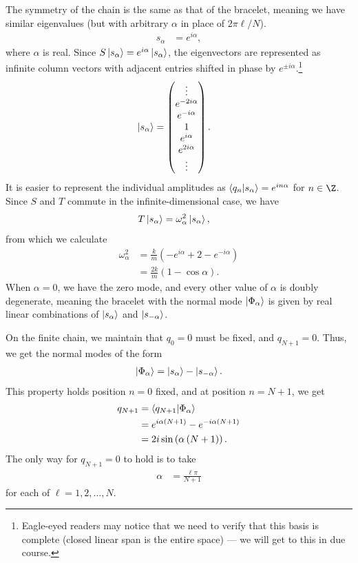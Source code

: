 \documentclass[10pt]{mypackage}
\begin{document}
\begin{example}
  The symmetry of the chain is the same as that of the bracelet, meaning we have similar eigenvalues (but with arbitrary $\alpha$ in place of $2\pi \ell/N$).
  \begin{align*}
    s_{\alpha} &= e^{i\alpha},
  \end{align*}
  where $\alpha$ is real. Since $S\ket{s_{\alpha}} = e^{i\alpha}\ket{s_{\alpha}}$, the eigenvectors are represented as infinite column vectors with adjacent entries shifted in phase by $e^{\pm i \alpha}$.\footnote{Eagle-eyed readers may notice that we need to verify that this basis is complete (closed linear span is the entire space) --- we will get to this in due course.}
  \begin{align*}
    \ket{s_{\alpha}} &= \begin{pmatrix}\vdots \\ e^{-2i\alpha} \\ e^{-i\alpha} \\ 1 \\ e^{i\alpha} \\ e^{2i\alpha}\\ \vdots\end{pmatrix}.
  \end{align*}
  It is easier to represent the individual amplitudes as $\braket{q_n}{s_{\alpha}} = e^{in\alpha}$ for $n\in \Z$. Since $S$ and $T$ commute in the infinite-dimensional case, we have
  \begin{align*}
    T\ket{s_\alpha} &= \omega_{\alpha}^{2}\ket{s_{\alpha}},
  \end{align*}
  from which we calculate
  \begin{align*}
    \omega_{\alpha}^2 &= \frac{k}{m}\left(-e^{i\alpha} + 2 - e^{-i\alpha}\right)\\
                      &= \frac{2k}{m}\left(1-\cos\alpha\right).
  \end{align*}
  When $\alpha = 0$, we have the zero mode, and every other value of $\alpha$ is doubly degenerate, meaning the bracelet with the normal mode $\ket{\Phi_{\alpha}}$ is given by real linear combinations of $\ket{s_{\alpha}}$ and $\ket{s_{-\alpha}}$.\newline

  On the finite chain, we maintain that $q_0 = 0$ must be fixed, and $q_{N+1} = 0$. Thus, we get the normal modes of the form
  \begin{align*}
    \ket{\Phi_{\alpha}} = \ket{s_{\alpha}} - \ket{s_{-\alpha}}.
  \end{align*}
  This property holds position $n=0$ fixed, and at position $n = N+1$, we get
  \begin{align*}
    q_{N+1} &= \braket{q_{N+1}}{\Phi_{\alpha}}\\
            &= e^{i\alpha \left(N+1\right)} - e^{-i\alpha \left(N+1\right)}\\
            &= 2i\sin\left(\alpha\left(N+1\right)\right).
  \end{align*}
  The only way for $q_{N+1} = 0$ to hold is to take
  \begin{align*}
    \alpha &= \frac{\ell \pi}{N+1}
  \end{align*}
  for each of $\ell = 1,2,\dots,N$.\newline


\end{example}
\end{document}
